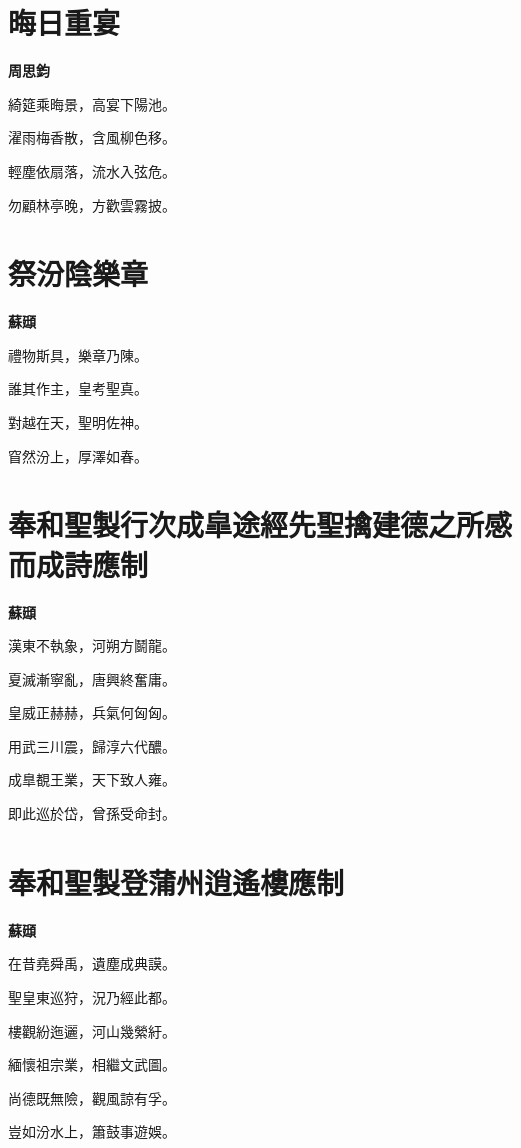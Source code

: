 \documentclass[12pt,a4paper]{ctexbook}
\begin{document}
\section{晦日重宴}
\textbf{周思鈞}\par\vspace{0.5em}
綺筵乘晦景，高宴下陽池。\par
濯雨梅香散，含風柳色移。\par
輕塵依扇落，流水入弦危。\par
勿顧林亭晚，方歡雲霧披。\par

\section{祭汾陰樂章}
\textbf{蘇頲}\par\vspace{0.5em}
禮物斯具，樂章乃陳。\par
誰其作主，皇考聖真。\par
對越在天，聖明佐神。\par
窅然汾上，厚澤如春。\par

\section{奉和聖製行次成皐途經先聖擒建德之所感而成詩應制}
\textbf{蘇頲}\par\vspace{0.5em}
漢東不執象，河朔方鬬龍。\par
夏滅漸寧亂，唐興終奮庸。\par
皇威正赫赫，兵氣何匈匈。\par
用武三川震，歸淳六代醲。\par
成臯覩王業，天下致人雍。\par
即此巡於岱，曾孫受命封。\par

\section{奉和聖製登蒲州逍遙樓應制}
\textbf{蘇頲}\par\vspace{0.5em}
在昔堯舜禹，遺塵成典謨。\par
聖皇東巡狩，況乃經此都。\par
樓觀紛迤邐，河山幾縈紆。\par
緬懷祖宗業，相繼文武圖。\par
尚德既無險，觀風諒有孚。\par
豈如汾水上，簫鼓事遊娛。\par
\end{document}
